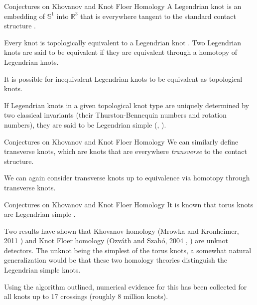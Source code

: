 \documentclass{beamer}
\begin{document}
    \begin{frame}{Conjectures on Khovanov and Knot Floer Homology}
        A Legendrian knot is an embedding of $\mathbb{S}^{1}$ into
        $\mathbb{R}^{3}$ that is everywhere tangent to the standard
        contact structure
        \cite[p.~1282-1283]{JoshuaMSabloffWhatIsLegendrianKnot}.
        \par\hfill\par
        Every knot is topologically equivalent to a Legendrian knot
        \cite[p.~1003]{VeraVertessiTransNonSimpleKnots}. Two
        Legendrian knots are said to be equivalent if they are equivalent
        through a homotopy of Legendrian knots.
        \par\hfill\par
        It is possible for inequivalent
        Legendrian knots to be equivalent as topological knots.
        \par\hfill\par
        If Legendrian knots in a given topological knot type are uniquely
        determined by two classical invariants (their Thurston-Bennequin
        numbers and rotation numbers), they are said to be Legendrian simple
        (\cite[p.~12]{Foldvari2019legnonsimple},
        \cite[p.~1004]{VeraVertessiTransNonSimpleKnots}).
    \end{frame}
    \begin{frame}{Conjectures on Khovanov and Knot Floer Homology}
        We can similarly define transverse knots, which are knots that are
        everywhere \textit{transverse} to the contact structure.
        \par\hfill\par
        We can again consider transverse knots up to equivalence via homotopy
        through transverse knots.
    \end{frame}
    \begin{frame}{Conjectures on Khovanov and Knot Floer Homology}
        It is known that torus knots are Legendrian simple
        \cite[p.~64]{EtnyreHondaContactTopologyI}.
        \par\hfill\par
        Two results have shown that Khovanov homology (Mrowka and Kronheimer,
        2011 \cite{KronheimerMrowka2011KhovanovUnknot})
        and Knot Floer homology
        (Ozv\'{a}th and Szab\'{o}, 2004
        \cite[p.~633]{ManolescuOzsvathSarkarCombinatorialDescriptionOfKnotFloerHomology},
        \cite[p.~313]{OzsvathSzaboHolomorphicDisksGenusBounds})
        are unknot detectors.
        The unknot being the simplest of the torus knots, a somewhat natural
        generalization would be that these two homology theories
        distinguish the Legendrian simple knots.
        \par\hfill\par
        Using the algorithm outlined, numerical evidence for this has been
        collected for all knots up to 17 crossings (roughly 8 million knots).
    \end{frame}
\end{document}
